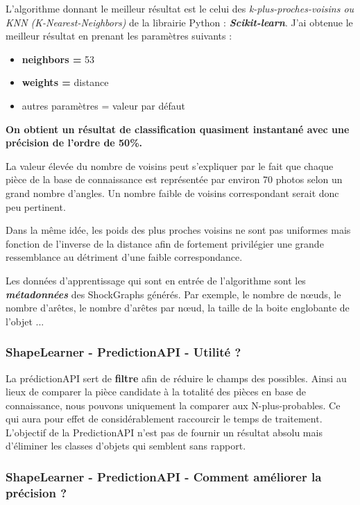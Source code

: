 L'algorithme donnant le meilleur résultat est le celui des \textit{k-plus-proches-voisins ou KNN (K-Nearest-Neighbors)} de la librairie Python : \textbf{\textit{Scikit-learn}}. J'ai obtenue le meilleur résultat en prenant les paramètres suivants :

\begin{itemize}
	\item \textbf{neighbors =}  53
	\item \textbf{weights =}  distance
	\item autres paramètres = valeur par défaut
\end{itemize}

\begin{center}
\textbf{On obtient un résultat de classification quasiment instantané avec une précision de l'ordre de 50\%.}
\end{center}

La valeur élevée du nombre de voisins peut s'expliquer par le fait que chaque pièce de la base de connaissance est représentée par environ 70 photos selon un grand nombre d'angles. Un nombre faible de voisins correspondant serait donc peu pertinent.

Dans la même idée, les poids des plus proches voisins ne sont pas uniformes mais fonction de l'inverse de la distance afin de fortement privilégier une grande ressemblance au détriment d'une faible correspondance.

Les données d'apprentissage qui sont en entrée de l'algorithme sont les \textit{\textbf{métadonnées}} des ShockGraphs générés. Par exemple, le nombre de nœuds, le nombre d'arêtes, le nombre d'arêtes par nœud, la taille de la boite englobante de l'objet ...

\subsubsection{ShapeLearner - PredictionAPI - Utilité ?}

La prédictionAPI sert de \textbf{filtre} afin de réduire le champs des possibles. Ainsi au lieux de comparer la pièce candidate à la totalité des pièces en base de connaissance, nous pouvons uniquement la comparer aux N-plus-probables. Ce qui aura pour effet de considérablement raccourcir le temps de traitement. L'objectif de la PredictionAPI n'est pas de fournir un résultat absolu mais d'éliminer les classes d'objets qui semblent sans rapport.

\subsubsection{ShapeLearner - PredictionAPI - Comment améliorer la précision ?}

